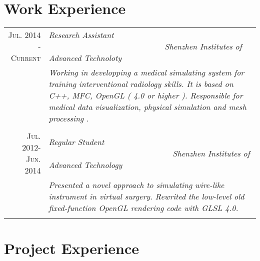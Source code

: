 \documentclass[a4paper,10pt]{article} %
\begin{document}

\section{Work Experience}

\begin{tabular}{r|p{12cm}}
\textsc{Jul. 2014 - Current} & \emph{Research Assistant} \ \ \ \ \ \ \ \ \ \ \ \ \ \ \ \ \ \ \ \ \ \ \ \ \ \ \ \ \          \emph{Shenzhen Institutes of Advanced Technoloty} \\
& \footnotesize{\emph{Working in developping a medical simulating system for training interventional radiology skills. It is based on C++, MFC, OpenGL ( 4.0 or higher ). Responsible for medical data visualization, physical simulation and mesh processing }}.\\

\multicolumn{2}{c}{} \\


\textsc{Jul. 2012- Jun. 2014} & \emph{Regular Student} \ \ \ \ \ \ \ \ \ \ \ \ \ \ \ \ \ \ \ \ \ \ \ \ \ \ \ \ \ \ \         \emph{Shenzhen Institutes of Advanced Technology} \emph{}\\
& \footnotesize{\emph{Presented a novel approach to simulating wire-like instrument in virtual surgery. Rewrited the low-level old fixed-function OpenGL rendering code with GLSL 4.0.}}\\
\multicolumn{2}{c}{} \\


\end{tabular}



\section{Project Experience}
\end{document}

